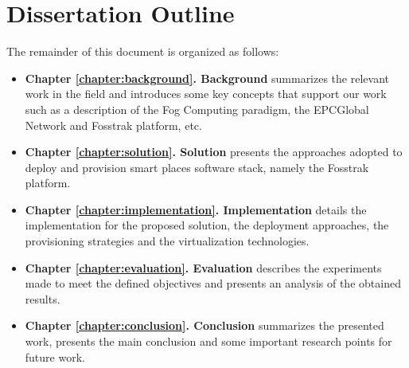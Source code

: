 \section{Dissertation Outline}
\label{section:outline}
The remainder of this document is organized as follows:
\begin{itemize}
  \item \textbf{Chapter \ref{chapter:background}. Background} summarizes the relevant work in the field and
  introduces some key concepts that support our work such as a description of the Fog Computing paradigm,
  the EPCGlobal Network and Fosstrak platform, etc.
  \item \textbf{Chapter \ref{chapter:solution}. Solution} presents the approaches adopted to deploy
  and provision smart places software stack, namely the Fosstrak platform.
  \item \textbf{Chapter \ref{chapter:implementation}. Implementation} details the implementation
  for the proposed solution, the deployment approaches, the provisioning strategies and the virtualization
  technologies.
  \item \textbf{Chapter \ref{chapter:evaluation}. Evaluation} describes the experiments made to meet
  the defined objectives and presents an analysis of the obtained results.
  \item \textbf{Chapter \ref{chapter:conclusion}. Conclusion} summarizes the presented work,
  presents the main conclusion and some important research points for future work.
\end{itemize}
